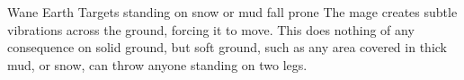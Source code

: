   {}%
  {Wane}%
  {Earth}%
  {}%
  {Targets standing on snow or mud fall prone}%
  {The mage creates subtle vibrations across the ground, forcing it to move.
    This does nothing of any consequence on solid ground, but soft ground, such as any area covered in thick mud, or snow, can throw anyone standing on two legs.}

